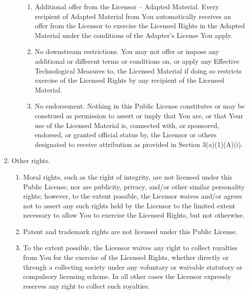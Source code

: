 \begin{enumerate}[label=\alph*.,ref=\alph*]
\begin{enumerate}[label=\arabic*.,ref=\arabic*]
\begin{enumerate}[label=\alph*.]
    \item Additional offer from the Licensor -- Adapted Material.
      Every recipient of Adapted Material from You automatically
      receives an offer from the Licensor to exercise the Licensed
      Rights in the Adapted Material under the conditions of the
      Adapter's License You apply.

    \item No downstream restrictions. You may not offer or impose
      any additional or different terms or conditions on, or apply
      any Effective Technological Measures to, the Licensed Material
      if doing so restricts exercise of the Licensed Rights by any
      recipient of the Licensed Material.

    \item No endorsement. Nothing in this Public License constitutes
      or may be construed as permission to assert or imply that You
      are, or that Your use of the Licensed Material is, connected
      with, or sponsored, endorsed, or granted official status by,
      the Licensor or others designated to receive attribution as
      provided in Section 3(a)(1)(A)(i).
    \end{enumerate}
  \end{enumerate}

\item Other rights.
  \begin{enumerate}[label=\arabic*.]
  \item Moral rights, such as the right of integrity, are not
    licensed under this Public License, nor are publicity,
    privacy, and/or other similar personality rights; however, to
    the extent possible, the Licensor waives and/or agrees not to
    assert any such rights held by the Licensor to the limited
    extent necessary to allow You to exercise the Licensed
    Rights, but not otherwise.

  \item Patent and trademark rights are not licensed under this
    Public License.

  \item To the extent possible, the Licensor waives any right to
    collect royalties from You for the exercise of the Licensed
    Rights, whether directly or through a collecting society
    under any voluntary or waivable statutory or compulsory
    licensing scheme. In all other cases the Licensor expressly
    reserves any right to collect such royalties.
  \end{enumerate}
\end{enumerate}

